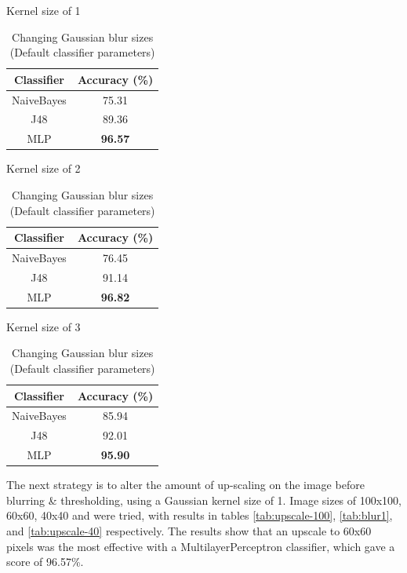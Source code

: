 \documentclass[12pt]{article}
\begin{document}
    \begin{table}[H]
      \begin{subtable}{.329\linewidth}
        \centering
        \caption{Kernel size of 1}
        \begin{tabular}{c|c}
          \toprule
          \multicolumn{1}{c|}{Classifier} & \multicolumn{1}{c}{Accuracy (\%)} \\
          \midrule
          NaiveBayes & 75.31 \\
          J48   & 89.36 \\
          MLP   & \textbf{96.57} \\
          \bottomrule
        \end{tabular}%
        \label{tab:blur1}%
      \end{subtable}
      \begin{subtable}{.329\linewidth}
        \centering
        \caption{Kernel size of 2}
        \begin{tabular}{c|c}
          \toprule
          Classifier & Accuracy (\%) \\
          \midrule
          NaiveBayes & 76.45 \\
          J48   & 91.14 \\
          MLP   & \textbf{96.82} \\
          \bottomrule
        \end{tabular}%
        \label{tab:blur2}%
      \end{subtable}
      \begin{subtable}{.329\linewidth}
        \centering
        \caption{Kernel size of 3}
        \begin{tabular}{c|c}
          \toprule
          Classifier & Accuracy (\%) \\
          \midrule
          NaiveBayes & 85.94 \\
          J48   & 92.01 \\
          MLP   & \textbf{95.90} \\
          \bottomrule
        \end{tabular}%
        \label{tab:blur3}%
      \end{subtable}
      \caption{Changing Gaussian blur sizes (Default classifier parameters)}
      \label{tab:blur}
    \end{table}
    The next strategy is to alter the amount of up-scaling on the image before blurring \& thresholding, using a Gaussian kernel size of 1. Image sizes of 100x100, 60x60, 40x40 and  were tried, with results in tables \ref{tab:upscale-100}, \ref{tab:blur1}, and \ref{tab:upscale-40} respectively. The results show that an upscale to 60x60 pixels was the most effective with a MultilayerPerceptron classifier, which gave a score of 96.57\%.
\end{document}
